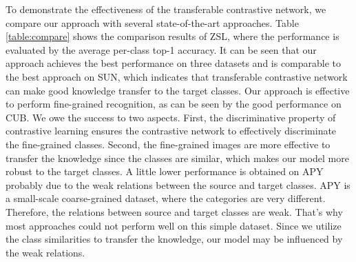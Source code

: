 \documentclass[10pt,twocolumn,letterpaper]{article}
\begin{document}
To demonstrate the effectiveness of the transferable contrastive network, we compare our approach with several state-of-the-art approaches. Table \ref{table:compare} shows the comparison results of ZSL, where the performance is evaluated by the average per-class top-1 accuracy. It can be seen that our approach achieves the best performance on three datasets and is comparable to the best approach on SUN, which indicates that transferable contrastive network can make good knowledge transfer to the target classes. Our approach is effective to perform fine-grained recognition, as can be seen by the good performance on CUB. We owe the success to two aspects. First, the discriminative property of contrastive learning ensures the contrastive network to effectively discriminate the fine-grained classes. Second, the fine-grained images are more effective to transfer the knowledge since the classes are similar, which makes our model more robust to the target classes. A little lower performance is obtained on APY probably due to the weak relations between the source and target classes. APY is a small-scale coarse-grained dataset, where the categories are very different. Therefore, the relations between source and target classes are weak. That's why most approaches could not perform well on this simple dataset. Since we utilize the class similarities to transfer the knowledge, our model may be influenced by the weak relations.
\end{document}
